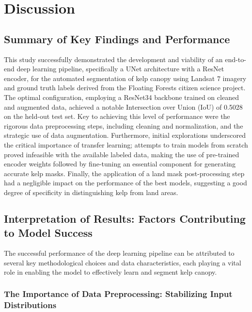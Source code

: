 \documentclass{article}
\begin{document}
\section{Discussion}

\subsection{Summary of Key Findings and Performance}

This study successfully demonstrated the development and viability of an end-to-end deep learning pipeline, specifically a UNet architecture with a ResNet encoder, for the automated segmentation of kelp canopy using Landsat 7 imagery and ground truth labels derived from the Floating Forests citizen science project. The optimal configuration, employing a ResNet34 backbone trained on cleaned and augmented data, achieved a notable Intersection over Union (IoU) of 0.5028 on the held-out test set. Key to achieving this level of performance were the rigorous data preprocessing steps, including cleaning and normalization, and the strategic use of data augmentation. Furthermore, initial explorations underscored the critical importance of transfer learning; attempts to train models from scratch proved infeasible with the available labeled data, making the use of pre-trained encoder weights followed by fine-tuning an essential component for generating accurate kelp masks. Finally, the application of a land mask post-processing step had a negligible impact on the performance of the best models, suggesting a good degree of specificity in distinguishing kelp from land areas.

\subsection{Interpretation of Results: Factors Contributing to Model Success}

The successful performance of the deep learning pipeline can be attributed to several key methodological choices and data characteristics, each playing a vital role in enabling the model to effectively learn and segment kelp canopy.

\subsubsection{The Importance of Data Preprocessing: Stabilizing Input Distributions}
\end{document}
